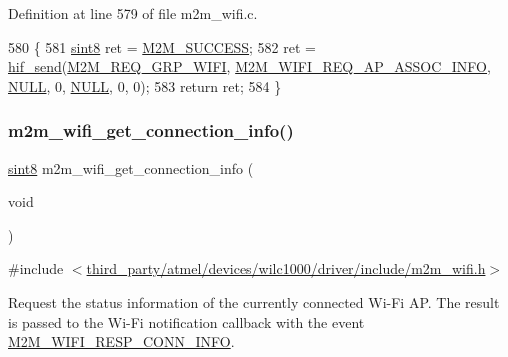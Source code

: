Definition at line 579 of file m2m\+\_\+wifi.\+c.


\begin{DoxyCode}
580 \{
581     \hyperlink{group__DataT_gae35f10ffd0ac8dd2bc3e794da9bdfbc7}{sint8} ret = \hyperlink{nm__common_8h_a9ef27ba27aafdd1aa3a79d3ba2c36b8f}{M2M\_SUCCESS};
582     ret = \hyperlink{m2m__hif_8c_a13ba8ad11b2ac39516ca787386d16ce0}{hif\_send}(\hyperlink{nm__common_8h_a9ab02eb1aea02a75c3f5aade4eef1276aeb9a7d57324ba4b8a6c2a5f46dd499c2}{M2M\_REQ\_GRP\_WIFI}, 
      \hyperlink{group__WlanEnums_ggaa62989ea5e2977b374a04db81c89d524a29641c61a3ed08222ca65a14bf2c2f24}{M2M\_WIFI\_REQ\_AP\_ASSOC\_INFO}, \hyperlink{group__BSPDefine_ga070d2ce7b6bb7e5c05602aa8c308d0c4}{NULL}, 0, \hyperlink{group__BSPDefine_ga070d2ce7b6bb7e5c05602aa8c308d0c4}{NULL}, 0, 0);
583     \textcolor{keywordflow}{return} ret;
584 \}
\end{DoxyCode}
\mbox{\label{group__GetConnectionInfoFn_gaf42861a22b362fd4d74939a009eb6592}} 
\subsubsection{\texorpdfstring{m2m\+\_\+wifi\+\_\+get\+\_\+connection\+\_\+info()}{m2m\_wifi\_get\_connection\_info()}}
{\footnotesize\ttfamily \hyperlink{group__DataT_gae35f10ffd0ac8dd2bc3e794da9bdfbc7}{sint8} m2m\+\_\+wifi\+\_\+get\+\_\+connection\+\_\+info (\begin{DoxyParamCaption}\item[{void}]{ }\end{DoxyParamCaption})}



{\ttfamily \#include $<$\hyperlink{m2m__wifi_8h}{third\+\_\+party/atmel/devices/wilc1000/driver/include/m2m\+\_\+wifi.\+h}$>$}



Request the status information of the currently connected Wi-\/\+Fi AP. The result is passed to the Wi-\/\+Fi notification callback with the event \hyperlink{group__WlanEnums_gga064de09dec1d5e88ed8d075fa40f57dea35767ad0217ab92b149bc77e79610d33}{M2\+M\+\_\+\+W\+I\+F\+I\+\_\+\+R\+E\+S\+P\+\_\+\+C\+O\+N\+N\+\_\+\+I\+N\+FO}. 

